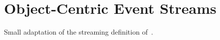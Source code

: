 %
%

\providecommand{\Usigma}{\mathbb{U}_{\Sigma}}
\providecommand{\Uact}{\mathbb{U}_{\mathit{act}}}
\providecommand{\Uobj}{\mathbb{U}_{\mathit{obj}}}
\providecommand{\Utype}{\mathbb{U}_{\mathit{type}}}
\providecommand{\Uattr}{\mathbb{U}_{\mathit{attr}}}
\providecommand{\Uval}{\mathbb{U}_{\mathit{val}}}
\providecommand{\Utime}{\mathbb{U}_{\mathit{time}}}
\providecommand{\Uqual}{\mathbb{U}_{\mathit{qual}}}

\newcommand{\dom}{\mathit{dom}}
\newcommand{\upd}{\mathit{upd}}
\newcommand{\fin}{\mathit{fin}}
\newcommand{\touched}{\mathit{touched}}
\newcommand{\score}{\mathit{score}}
\newcommand{\dl}{\delta}                    %
\newcommand{\hupd}{\rho}                    %
\newcommand{\proj}[2]{#1\!\Downarrow_{#2}}  %
\newcommand{\obj}{\mathit{obj}}
\newcommand{\otype}{\mathit{type}}
\newcommand{\alast}{a_{\mathit{last}}}
\newcommand{\Rcap}{\textsc{cap}}
\newcommand{\Rexp}{\textsc{exp}}
\newcommand{\Rdis}{\textsc{dis}}

\section{Object-Centric Event Streams}\label{sec:streams}

Small adaptation of the streaming definition of~\cite{Liss2025}.

